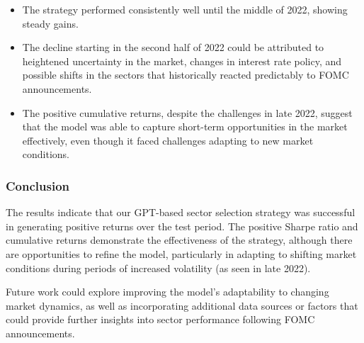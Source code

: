 \documentclass[11pt]{article}
\begin{document}
\begin{itemize}
    \item The strategy performed consistently well until the middle of 2022, showing steady gains.
    \item The decline starting in the second half of 2022 could be attributed to heightened uncertainty in the market, changes in interest rate policy, and possible shifts in the sectors that historically reacted predictably to FOMC announcements.
    \item The positive cumulative returns, despite the challenges in late 2022, suggest that the model was able to capture short-term opportunities in the market effectively, even though it faced challenges adapting to new market conditions.
\end{itemize}

\subsubsection*{Conclusion}
The results indicate that our GPT-based sector selection strategy was successful in generating positive returns over the test period. The positive Sharpe ratio and cumulative returns demonstrate the effectiveness of the strategy, although there are opportunities to refine the model, particularly in adapting to shifting market conditions during periods of increased volatility (as seen in late 2022).

Future work could explore improving the model's adaptability to changing market dynamics, as well as incorporating additional data sources or factors that could provide further insights into sector performance following FOMC announcements.
\end{document}
